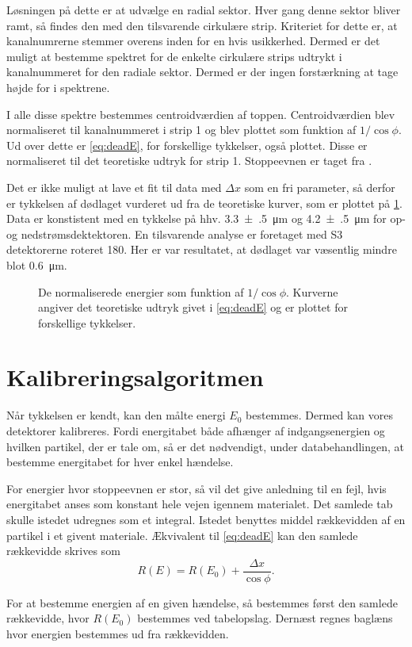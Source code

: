 Løsningen på dette er at udvælge en radial sektor. Hver gang denne sektor bliver ramt, så findes den
med den tilsvarende cirkulære strip. Kriteriet for dette er, at kanalnumrerne stemmer overens inden
for en hvis usikkerhed. Dermed er det muligt at bestemme spektret for de enkelte cirkulære strips
udtrykt i kanalnummeret for den radiale sektor. Dermed er der ingen forstærkning at tage
højde for i spektrene.

I alle disse spektre bestemmes centroidværdien af \Pu toppen.
Centroidværdien blev normaliseret til kanalnummeret i strip 1 og blev plottet som funktion af
$1/{\cos \phi}$. Ud over dette er \cref{eq:deadE}, for forskellige tykkelser, også plottet. Disse er
normaliseret til det teoretiske udtryk for strip 1. Stoppeevnen er taget fra \cite{Ziegler}.

Det er ikke muligt at lave et fit til data med $\Delta x$ som en fri parameter, så derfor er tykkelsen af
dødlaget vurderet ud fra de teoretiske kurver, som er plottet på \cref{fig:dead}. Data er
konstistent med en tykkelse på hhv. \SI{3.3(5)}{\um} og \SI{4.2(5)}{\um} for op- og
nedstrømsdektektoren. En tilsvarende analyse er foretaget med S3 detektorerne roteret
180\degree. Her er var resultatet, at dødlaget var væsentlig mindre blot
\SI{0.6}{\um}. 

\begin{figure}[h]
  \centering
  \hfill
  \caption{De normaliserede energier som funktion af $1/{\cos\phi}$. Kurverne angiver det teoretiske
    udtryk givet i \cref{eq:deadE} og er plottet for forskellige tykkelser.}
  \label{fig:dead}
\end{figure}


\section{Kalibreringsalgoritmen}
\label{sec:kalalgo}

Når tykkelsen er kendt, kan den målte energi $E_{0}$ bestemmes. Dermed kan vores detektorer
kalibreres. Fordi energitabet både afhænger af indgangsenergien og hvilken partikel, der er tale om,
så er det nødvendigt, under databehandlingen, at bestemme energitabet for hver enkel hændelse.

For energier hvor stoppeevnen er stor, så vil det give anledning til en fejl, hvis energitabet anses
som konstant hele vejen igennem materialet. Det samlede tab skulle istedet udregnes som et
integral. Istedet benyttes middel rækkevidden af en partikel i et givent
materiale. Ækvivalent til \cref{eq:deadE} kan den samlede rækkevidde skrives som
\begin{equation}
  \label{eq:deadR}
  R(E) = R(E_{0}) + \frac{\Delta x}{\cos \phi} .
\end{equation}

For at bestemme energien af en given hændelse, så bestemmes først den samlede rækkevidde, hvor
$R(E_{0})$ bestemmes ved tabelopslag. Dernæst regnes baglæns hvor energien bestemmes ud fra
rækkevidden. 











